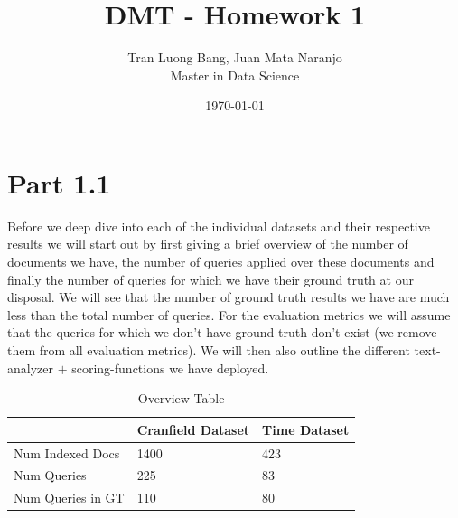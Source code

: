 \documentclass[12pt]{article}
\title{DMT - Homework 1}
\author{
        Tran Luong Bang, Juan Mata Naranjo \\
                Master in Data Science}
\date{\today}
\begin{document}
\maketitle
\newpage

\section{Part 1.1}

Before we deep dive into each of the individual datasets and their respective results we will start out by first giving a brief overview of the number of documents we have, the number of queries applied over these documents and finally the number of queries for which we have their ground truth at our disposal. We will see that the number of ground truth results we have are much less than the total number of queries. For the evaluation metrics we will assume that the queries for which we don't have ground truth don't exist (we remove them from all evaluation metrics). We will then also outline the different text-analyzer $+$ scoring-functions we have deployed.

\begin{table}[]
\centering
\begin{tabular}{|l|l|l|}
\hline
                  & Cranfield Dataset & Time Dataset \\ \hline
Num Indexed Docs  & 1400                 & 423            \\ \hline
Num Queries       & 225                 & 83            \\ \hline
Num Queries in GT & 110                 &  80           \\ \hline
\end{tabular}
\caption{Overview Table}
\label{Overview Table}
\end{table}
\end{document}
